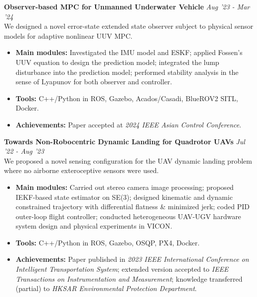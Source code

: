 \documentclass[overlapped]{res}
\begin{document}
\begin{resume}
\textbf{Observer-based MPC for Unmanned Underwater Vehicle}  
\hfill \textit{Aug '23 - Mar  '24} \\
We designed a novel error-state extended state observer subject to physical sensor models for adaptive nonlinear UUV MPC. 

\begin{itemize}
  \item \textbf{Main modules:} Investigated the IMU model and ESKF; applied Fossen's UUV equation to design the prediction model; integrated the lump disturbance into the prediction model; performed stability analysis in the sense of Lyapunov for both observer and controller.
  \item \textbf{Tools:} C++/Python in ROS, Gazebo, Acados/Casadi, BlueROV2 SITL, Docker.
  \item \textbf{Achievements:} Paper accepted at \textit{2024 IEEE Asian Control Conference}.
\end{itemize}

\textbf{Towards Non-Robocentric Dynamic Landing for Quadrotor UAVs} 
\hfill \textit{Jul '22 - Aug  '23} \\
We proposed a novel sensing configuration for the UAV dynamic landing problem where no airborne exteroceptive sensors were used.

\begin{itemize}
  \item \textbf{Main modules:} Carried out stereo camera image processing; proposed IEKF-based state estimator on SE(3); designed kinematic and dynamic constrained trajectory with differential flatness \& minimized jerk; coded PID outer-loop flight controller; conducted heterogeneous UAV-UGV hardware system design and physical experiments in VICON.
  \item \textbf{Tools:} C++/Python in ROS, Gazebo, OSQP, PX4, Docker.
  \item \textbf{Achievements:} Paper published in \textit{2023 IEEE International Conference on Intelligent Transportation System}; extended version accepted to \textit{IEEE Transactions on Instrumentation and Measurement}; knowledge transferred (partial) to \textit{HKSAR Environmental Protection Department}.
\end{itemize}



\end{resume}
\end{document}
